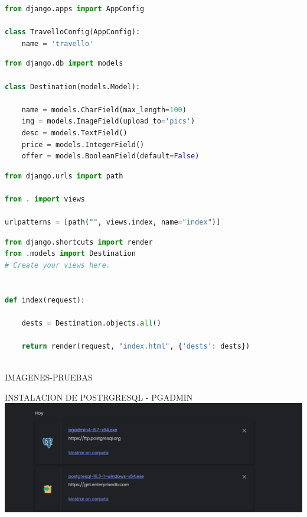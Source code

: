 \documentclass{article}
\begin{document}
        \begin{lstlisting}[language=Python, caption=apps.py]
from django.apps import AppConfig

class TravelloConfig(AppConfig):
    name = 'travello'

        \end{lstlisting} 
        
        \begin{lstlisting}[language=Python, caption=models.py]
from django.db import models

class Destination(models.Model):
    
    name = models.CharField(max_length=100)
    img = models.ImageField(upload_to='pics')
    desc = models.TextField()
    price = models.IntegerField()
    offer = models.BooleanField(default=False)
        \end{lstlisting} 

        \begin{lstlisting}[language=Python, caption=urls.py]
from django.urls import path

from . import views

urlpatterns = [path("", views.index, name="index")]

        \end{lstlisting} 

\begin{lstlisting}[language=Python, caption=views.py]
from django.shortcuts import render
from .models import Destination
# Create your views here.


def index(request):

    dests = Destination.objects.all()

    return render(request, "index.html", {'dests': dests})
    
        \end{lstlisting} 

        \newline\newline\newline\newline\newline\newline\newline\newline
        \item IMAGENES-PRUEBAS

        \item INSTALACION DE POSTRGRESQL - PGADMIN
        \newline\newline\newline
        \includegraphics[width=1\textwidth,keepaspectratio]{IMAGENES/Instalacion de postgree y pgadmin.png}
\end{document}
